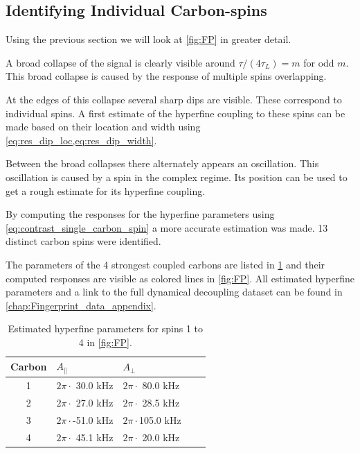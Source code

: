 \subsection{Identifying Individual Carbon-spins}
Using the previous section we will look at \cref{fig:FP} in greater detail.

A broad collapse of the signal is clearly visible around $\tau/(4\tau_L) = m$ for odd $m$.
This broad collapse is caused by the response of multiple spins overlapping.

At the edges of this collapse several sharp dips are visible.
These correspond to individual spins.
A first estimate of the hyperfine coupling to these spins can be made based on their location and width using \cref{eq:res_dip_loc,eq:res_dip_width}.

Between the broad collapses there alternately appears an oscillation.
This oscillation is caused by a spin in the complex regime.
Its position can be used to get a rough estimate for its hyperfine coupling.

By computing the responses for the hyperfine parameters using \cref{eq:contrast_single_carbon_spin} a more accurate estimation was made.
13 distinct carbon spins were identified.

The parameters of the 4 strongest coupled carbons are listed in \cref{tbl:HF_par} and their computed responses are visible as colored lines in \cref{fig:FP}.
All estimated hyperfine parameters and a link to the full dynamical decoupling dataset can be found in \cref{chap:Fingerprint_data_appendix}.

\begin{table}[htbp]
\centering
    \caption{Estimated hyperfine parameters for spins 1 to 4 in \cref{fig:FP}.}
    \begin{tabular}{cllll}
    Carbon & \quad \quad  $A_{\parallel} $ & \quad \quad $A_{\perp}$ \\ \hline
    1         & $2 \pi \cdot${ }30.0 kHz             & $2 \pi \cdot${ }80.0 kHz                \\
    2         & $2 \pi \cdot${ }27.0 kHz             & $2 \pi \cdot${ }28.5 kHz              \\
    3         & $2 \pi \cdot$-51.0 kHz          & $2 \pi \cdot$105.0 kHz              \\
    4         & $2 \pi \cdot${ }45.1 kHz           & $2 \pi \cdot${ }20.0 kHz                \\
    \end{tabular}
    \label{tbl:HF_par}
\end{table}

